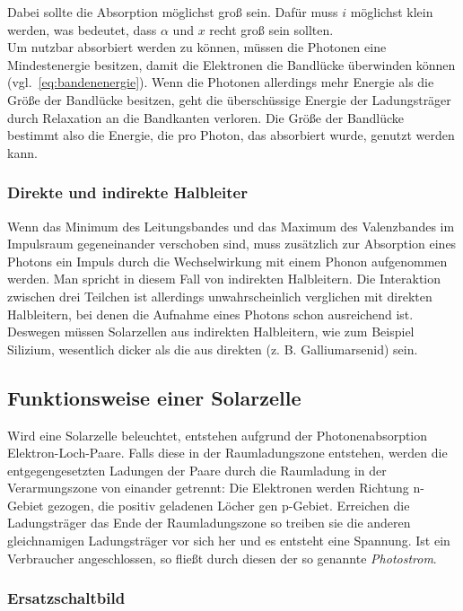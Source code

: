 \documentclass[slug=SZ, room=Hermann-Krone-Bau\,\ Labor\ 1.25,
supervisor=Martin\ Kroll, coursedate=14.\ 11.\ 2019]{../../Lab_Report_LaTeX/lab_report}
\begin{document}
Dabei sollte die Absorption möglichst groß sein. Dafür muss \(i\) möglichst klein werden, was bedeutet, dass
\(\alpha\) und \(x\) recht groß sein sollten.\\

Um nutzbar absorbiert werden zu können, müssen die Photonen eine Mindestenergie besitzen, damit die Elektronen
die Bandlücke überwinden können (vgl.~\eqref{eq:bandenenergie}). Wenn die Photonen allerdings mehr Energie als
die Größe der Bandlücke besitzen, geht die überschüssige Energie der Ladungsträger durch Relaxation an die
Bandkanten verloren. Die Größe der Bandlücke bestimmt also die Energie, die pro Photon, das absorbiert wurde,
genutzt werden kann.

\subsubsection{Direkte und indirekte Halbleiter}
\label{sec:dirindhalb}

Wenn das Minimum des Leitungsbandes und das Maximum des Valenzbandes im Impulsraum gegeneinander verschoben sind,
muss zusätzlich zur Absorption eines Photons ein Impuls durch die Wechselwirkung mit einem Phonon aufgenommen
werden. Man spricht in diesem Fall von indirekten Halbleitern. Die Interaktion zwischen drei Teilchen ist
allerdings unwahrscheinlich verglichen mit direkten Halbleitern, bei denen die Aufnahme eines Photons schon
ausreichend ist.
Deswegen müssen Solarzellen aus indirekten Halbleitern, wie zum Beispiel Silizium, wesentlich dicker als die
aus direkten (z. B. Galliumarsenid) sein.

\subsection{Funktionsweise einer Solarzelle}
\label{sec:solar}

Wird eine Solarzelle beleuchtet, entstehen aufgrund der Photonenabsorption Elektron-Loch-Paare. Falls diese in der
Raumladungszone entstehen, werden die entgegengesetzten Ladungen der Paare durch die Raumladung in der
Verarmungszone von einander getrennt:
Die Elektronen werden Richtung n-Gebiet gezogen, die positiv geladenen Löcher gen p-Gebiet.
Erreichen die Ladungsträger das Ende der Raumladungszone so treiben sie die anderen gleichnamigen Ladungsträger
vor sich her und es entsteht eine Spannung. Ist ein Verbraucher angeschlossen, so fließt durch diesen der so genannte \emph{Photostrom}.

\subsubsection{Ersatzschaltbild}
\label{sec:ersatz}
\end{document}
